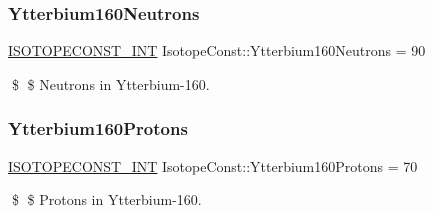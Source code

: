 \subsubsection{\texorpdfstring{Ytterbium160\+Neutrons}{Ytterbium160Neutrons}}
{\footnotesize\ttfamily \mbox{\hyperlink{group___isotope_const-_macros_ga5f18360b3e99483a35c32d789e62621c}{I\+S\+O\+T\+O\+P\+E\+C\+O\+N\+S\+T\+\_\+\+I\+NT}} Isotope\+Const\+::\+Ytterbium160\+Neutrons = 90}

\$ \$ Neutrons in Ytterbium-\/160. \mbox{\label{group___isotope_const-_ytterbium-_yb160_gaba87e2b17cdd8f33b6bca563fc1c2d41}} 
\subsubsection{\texorpdfstring{Ytterbium160\+Protons}{Ytterbium160Protons}}
{\footnotesize\ttfamily \mbox{\hyperlink{group___isotope_const-_macros_ga5f18360b3e99483a35c32d789e62621c}{I\+S\+O\+T\+O\+P\+E\+C\+O\+N\+S\+T\+\_\+\+I\+NT}} Isotope\+Const\+::\+Ytterbium160\+Protons = 70}

\$ \$ Protons in Ytterbium-\/160. 